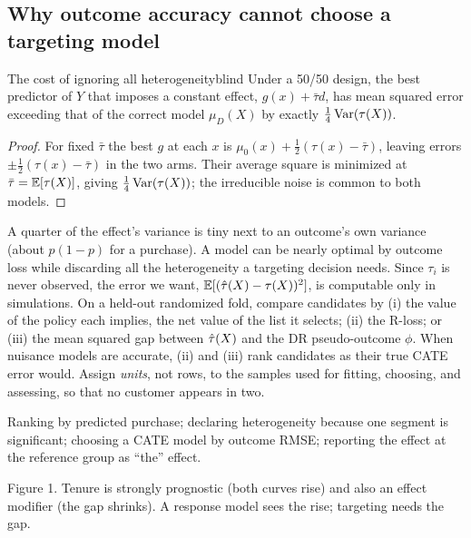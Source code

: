 \documentclass[11pt]{article}
\begin{document}
\subsection{Why outcome accuracy cannot choose a targeting model}

\begin{prop}{The cost of ignoring all heterogeneity}{blind}
Under a 50/50 design, the best predictor of $Y$ that imposes a constant effect, $g(x) + \bar\tau d$, has mean
squared error exceeding that of the correct model $\mu_D(X)$ by exactly $\tfrac14\operatorname{Var}(\tau(X))$.
\end{prop}
\begin{proof}
For fixed $\bar\tau$ the best $g$ at each $x$ is $\mu_0(x) + \tfrac12(\tau(x) - \bar\tau)$, leaving errors
$\pm\tfrac12(\tau(x) - \bar\tau)$ in the two arms. Their average square is minimized at $\bar\tau = \mathbb{E}[\tau(X)]$,
giving $\tfrac14\operatorname{Var}(\tau(X))$; the irreducible noise is common to both models.
\end{proof}

A quarter of the effect's variance is tiny next to an outcome's own variance (about $p(1-p)$ for a purchase).
A model can be nearly optimal by outcome loss while discarding all the heterogeneity a targeting decision
needs. Since $\tau_i$ is never observed, the error we want, $\mathbb{E}[(\hat{\tau}(X) - \tau(X))^2]$, is computable only in
simulations. On a held-out randomized fold, compare candidates by (i) the value of the policy each implies, the net
value of the list it selects; (ii) the R-loss; or (iii) the mean squared gap between $\hat{\tau}(X)$ and the DR pseudo-outcome $\phi$.
When nuisance models are accurate, (ii) and (iii) rank candidates as their true CATE error would. Assign
\emph{units}, not rows, to the samples used for fitting, choosing, and assessing, so that no customer appears in two.

\begin{pitfall}
Ranking by predicted purchase; declaring heterogeneity because one segment is significant; choosing a CATE
model by outcome RMSE; reporting the effect at the reference group as ``the'' effect.
\end{pitfall}

\begin{center}

\small Figure 1. Tenure is strongly prognostic (both curves rise) and also an effect modifier (the gap shrinks).
A response model sees the rise; targeting needs the gap.
\end{center}
\end{document}
